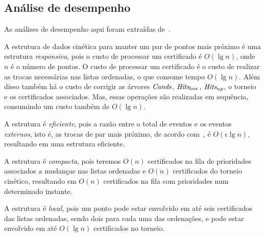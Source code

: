 







\FloatBarrier

\subsection{Análise de desempenho}\label{subsec:par:analise-de-desempenho}

As análises de desempenho aqui foram extraídas de~\cite{eduardo}.

A estrutura de dados cinética para manter um par de pontos mais próximo é uma estrutura
\textit{responsiva}, pois o custo de processar um certificado é $O(\lg{n})$, onde $n$ é o número
de pontos.
O custo de processar um certificado é o custo de realizar as trocas necessárias nas listas
ordenadas, o que consome tempo $O(\lg{n})$.
Além disso também há o custo de corrigir as árvores $\textit{Cands}$, $\textit{Hits}_{low}$, $\textit{Hits}_{up}$, o
torneio e os certificados associados.
Mas, essas operações são realizadas em sequência, consumindo um custo também de $O(\lg{n})$.

A estrutura é \textit{eficiente}, pois a razão entre o total de eventos e os eventos
\textit{externos}, isto é, as trocas de par mais próximo, de acordo com~\cite{eduardo}, é
$O(\epsilon \lg{n})$, resultando em uma estrutura eficiente.

A estrutura é \textit{compacta}, pois teremos $O(n)$ certificados na fila de prioridades
associados a mudanças nas listas ordenadas e $O(n)$ certificados do torneio cinético, resultando
em $O(n)$ certificados na fila com prioridades num determinado instante.

A estrutura é \textit{local}, pois um ponto pode estar envolvido em até seis certificados das
listas ordenadas, sendo dois para cada uma das ordenações, e pode estar envolvido em até
$O(\lg{n})$ certificados no torneio.
